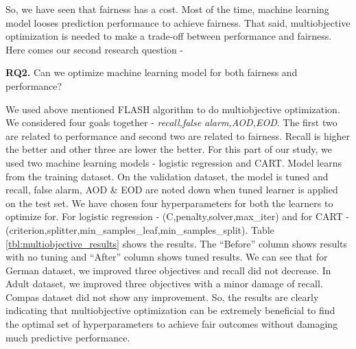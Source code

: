 \documentclass[10pt,conference]{IEEEtran}
\begin{document}
So, we have seen that fairness has a cost. Most of the time, machine learning model looses prediction performance to achieve fairness. That said, multiobjective optimization is needed to make a trade-off between performance and fairness. Here comes our second research question - 

\begin{RQ}
{\bf RQ2.} Can we optimize machine learning model for both fairness and performance?
\end{RQ}


We used above mentioned FLASH algorithm to do multiobjective optimization. We considered four goals together - \textit{recall,false alarm,AOD,EOD}. The first two are related to performance and second two are related to fairness. Recall is higher the better and other three are lower the better. For this part of our study, we used two machine learning models - logistic regression and CART. Model learns from the training dataset. On the validation dataset, the model is tuned and recall, false alarm, AOD \& EOD are noted down when tuned learner is applied on the test set. We have chosen four hyperparameters for both the learners to optimize for. For logistic regression - (C,penalty,solver,max\_iter) and for CART - (criterion,splitter,min\_samples\_leaf,min\_samples\_split). Table \ref{tbl:multiobjective_results} shows the results. The ``Before'' column shows results with no tuning and ``After'' column shows tuned results. We can see that for German dataset, we improved three objectives and recall did not decrease. In Adult dataset, we improved three objectives with a minor damage of recall. Compas dataset did not show any improvement. So, the results are clearly indicating that multiobjective  optimization can be extremely beneficial to find the optimal set of hyperparameters to achieve fair outcomes without damaging much predictive performance. 
\end{document}
